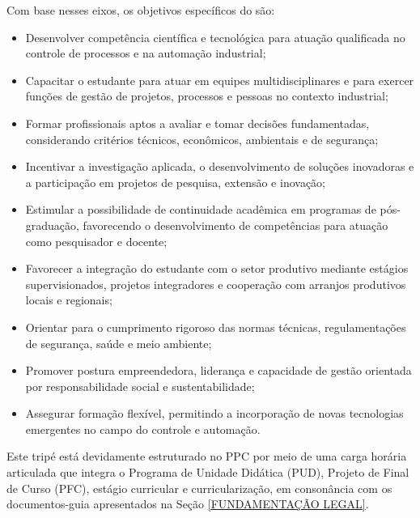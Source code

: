 Com base nesses eixos, os objetivos específicos do  \NOMECURSO são:

\begin{itemize}
	\item Desenvolver competência científica e tecnológica para atuação qualificada no controle de processos e na automação industrial;
	\item Capacitar o estudante para atuar em equipes multidisciplinares e para exercer funções de gestão de projetos, processos e pessoas no contexto industrial;
	\item Formar profissionais aptos a avaliar e tomar decisões fundamentadas, considerando critérios técnicos, econômicos, ambientais e de segurança;
	\item Incentivar a investigação aplicada, o desenvolvimento de soluções inovadoras e a participação em projetos de pesquisa, extensão e inovação;
	\item Estimular a possibilidade de continuidade acadêmica em programas de pós-graduação, favorecendo o desenvolvimento de competências para atuação como pesquisador e docente;
	\item Favorecer a integração do estudante com o setor produtivo mediante estágios supervisionados, projetos integradores e cooperação com arranjos produtivos locais e regionais;
	\item Orientar para o cumprimento rigoroso das normas técnicas, regulamentações de segurança, saúde e meio ambiente;
	\item Promover postura empreendedora, liderança e capacidade de gestão orientada por responsabilidade social e sustentabilidade;
	\item Assegurar formação flexível, permitindo a incorporação de novas tecnologias emergentes no campo do controle e automação.
\end{itemize}

Este tripé está devidamente estruturado no PPC por meio de uma carga horária articulada que integra o Programa de Unidade Didática (PUD),  Projeto de Final de Curso (PFC), estágio curricular e curricularização, em consonância com os documentos-guia apresentados na Seção \ref{FUNDAMENTAÇÃO LEGAL}.